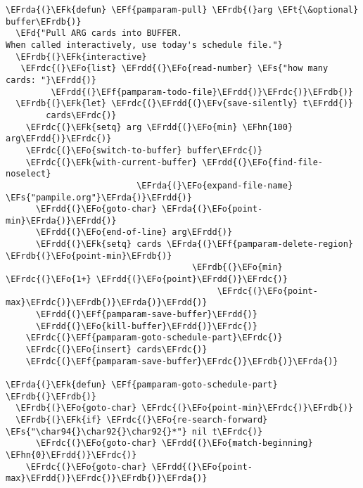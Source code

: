 \documentclass[a4wide,10pt]{article}
\newcommand{\EFs}[1]{\textcolor{EFs}{#1}} %
\newcommand{\EFd}[1]{\textcolor{EFd}{#1}} %
\newcommand{\EFk}[1]{\textcolor{EFk}{#1}} %
\newcommand{\EFf}[1]{\textcolor{EFf}{#1}} %
\newcommand{\EFv}[1]{\textcolor{EFv}{#1}} %
\newcommand{\EFt}[1]{\textcolor{EFt}{#1}} %
\newcommand{\EFo}[1]{\textcolor{EFo}{#1}} %
\newcommand{\EFhn}[1]{\textcolor{EFhn}{\textbf{#1}}} %
\newcommand{\EFrda}[1]{\textcolor{EFrda}{#1}} %
\newcommand{\EFrdb}[1]{\textcolor{EFrdb}{#1}} %
\newcommand{\EFrdc}[1]{\textcolor{EFrdc}{#1}} %
\newcommand{\EFrdd}[1]{\textcolor{EFrdd}{#1}} %
\begin{document}
\begin{Code}
\begin{Verbatim}
\EFrda{(}\EFk{defun} \EFf{pamparam-pull} \EFrdb{(}arg \EFt{\&optional} buffer\EFrdb{)}
  \EFd{"Pull ARG cards into BUFFER.
When called interactively, use today's schedule file."}
  \EFrdb{(}\EFk{interactive}
   \EFrdc{(}\EFo{list} \EFrdd{(}\EFo{read-number} \EFs{"how many cards: "}\EFrdd{)}
         \EFrdd{(}\EFf{pamparam-todo-file}\EFrdd{)}\EFrdc{)}\EFrdb{)}
  \EFrdb{(}\EFk{let} \EFrdc{(}\EFrdd{(}\EFv{save-silently} t\EFrdd{)}
        cards\EFrdc{)}
    \EFrdc{(}\EFk{setq} arg \EFrdd{(}\EFo{min} \EFhn{100} arg\EFrdd{)}\EFrdc{)}
    \EFrdc{(}\EFo{switch-to-buffer} buffer\EFrdc{)}
    \EFrdc{(}\EFk{with-current-buffer} \EFrdd{(}\EFo{find-file-noselect}
                          \EFrda{(}\EFo{expand-file-name} \EFs{"pampile.org"}\EFrda{)}\EFrdd{)}
      \EFrdd{(}\EFo{goto-char} \EFrda{(}\EFo{point-min}\EFrda{)}\EFrdd{)}
      \EFrdd{(}\EFo{end-of-line} arg\EFrdd{)}
      \EFrdd{(}\EFk{setq} cards \EFrda{(}\EFf{pamparam-delete-region} \EFrdb{(}\EFo{point-min}\EFrdb{)}
                                     \EFrdb{(}\EFo{min} \EFrdc{(}\EFo{1+} \EFrdd{(}\EFo{point}\EFrdd{)}\EFrdc{)}
                                          \EFrdc{(}\EFo{point-max}\EFrdc{)}\EFrdb{)}\EFrda{)}\EFrdd{)}
      \EFrdd{(}\EFf{pamparam-save-buffer}\EFrdd{)}
      \EFrdd{(}\EFo{kill-buffer}\EFrdd{)}\EFrdc{)}
    \EFrdc{(}\EFf{pamparam-goto-schedule-part}\EFrdc{)}
    \EFrdc{(}\EFo{insert} cards\EFrdc{)}
    \EFrdc{(}\EFf{pamparam-save-buffer}\EFrdc{)}\EFrdb{)}\EFrda{)}

\EFrda{(}\EFk{defun} \EFf{pamparam-goto-schedule-part} \EFrdb{(}\EFrdb{)}
  \EFrdb{(}\EFo{goto-char} \EFrdc{(}\EFo{point-min}\EFrdc{)}\EFrdb{)}
  \EFrdb{(}\EFk{if} \EFrdc{(}\EFo{re-search-forward} \EFs{"\char94{}\char92{}\char92{}*"} nil t\EFrdc{)}
      \EFrdc{(}\EFo{goto-char} \EFrdd{(}\EFo{match-beginning} \EFhn{0}\EFrdd{)}\EFrdc{)}
    \EFrdc{(}\EFo{goto-char} \EFrdd{(}\EFo{point-max}\EFrdd{)}\EFrdc{)}\EFrdb{)}\EFrda{)}


\end{Verbatim}
\end{Code}
\end{document}
